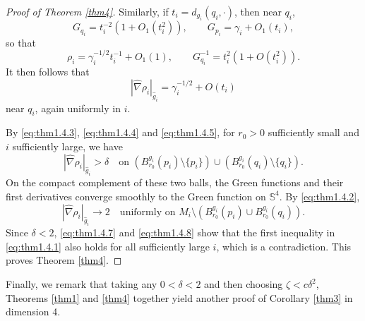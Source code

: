 \documentclass[11pt]{amsart}
\theoremstyle{plain}
\numberwithin{equation}{section}
\renewcommand{\S}{\mathbb{S}}
\newcommand{\hn}{\widehat{\nabla}}
\newcommand{\hg}{\widehat{g}}
\begin{document}
\begin{proof}[Proof of Theorem \ref{thm4}]
Similarly, if $t_i=d_{g_i}(q_i,\cdot)$, then near $q_i$,
\begin{equation*}
G_{q_i}=t_i^{-2}(1+O_1(t_i^2)),\qquad G_{p_i}=\gamma_i+O_1(t_i),
\end{equation*}
so that
\begin{equation*}
\rho_i=\gamma_i^{-1/2}t_i^{-1}+O_1(1),\qquad G_{q_i}^{-1}=t_i^2(1+O(t_i^2)).
\end{equation*}
It then follows that
\begin{equation}\label{eq:thm1.4.5}
|\hn\rho_i|_{\hg_i}=\gamma_i^{-1/2}+O(t_i)
\end{equation}
near $q_i$, again uniformly in $i$.

By \eqref{eq:thm1.4.3}, \eqref{eq:thm1.4.4} and \eqref{eq:thm1.4.5}, for $r_0>0$ sufficiently small and $i$ sufficiently large, we have
\begin{equation}\label{eq:thm1.4.7}
|\hn\rho_i|_{\hg_i}>\delta\quad\text{on } (B_{r_0}^{g_i}(p_i)\setminus\{p_i\})\cup(B_{r_0}^{g_i}(q_i)\setminus\{q_i\}). 
\end{equation}
On the compact complement of these two balls, the Green functions and their first derivatives converge smoothly to the Green function on $\S^4$. By \eqref{eq:thm1.4.2},
\begin{equation}\label{eq:thm1.4.8}
|\hn\rho_i|_{\hg_i}\rightarrow 2\quad\text{uniformly on } M_i\setminus(B_{r_0}^{g_i}(p_i)\cup B_{r_0}^{g_i}(q_i)).
\end{equation}
Since $\delta<2$, \eqref{eq:thm1.4.7} and \eqref{eq:thm1.4.8} show that the first inequality in \eqref{eq:thm1.4.1} also holds for all sufficiently large $i$, which is a contradiction. This proves Theorem \ref{thm4}. 
\end{proof}

Finally, we remark that taking any $0<\delta<2$ and then choosing $\zeta<c\delta^2$, Theorems \ref{thm1} and \ref{thm4} together yield another proof of Corollary \ref{thm3} in dimension 4.



\end{document}
